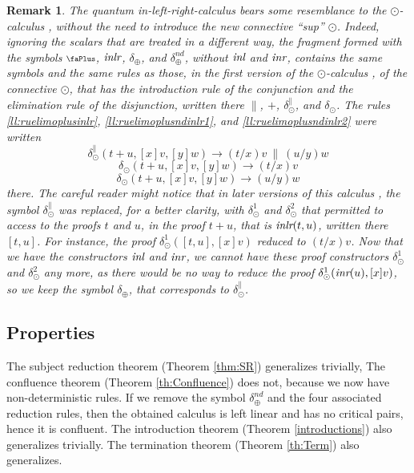 \documentclass[screen, sigconf,authorversion,nonacm]{acmart}
\theoremstyle{acmdefinition}
\newtheorem{remark}[theorem]{Remark}}
\numberwithin{equation}{section}
\newcommand\abstr[1]{[#1]}
\newcommand\inl{\mbox{\it inl}}
\newcommand\inr{\mbox{\it inr}}
\newcommand\inlr{\mbox{\it inlr}}
\newcommand\elimsup{\delta_{\odot}}
\newcommand\plus{\mathrel{\text{\normalfont\scalebox{0.7}{\faPlus}}}}
\newcommand\elimplus{\delta_{\oplus}}
\begin{document}
\begin{remark}
The quantum in-left-right-calculus bears some resemblance to the
$\odot$-calculus \cite{DiazcaroDowekTCS23,DiazcaroDowekMSCS24},
without the need to introduce the new connective ``sup'' $\odot$.
Indeed, ignoring the scalars that are treated in a different way, the
fragment formed with the symbols $\plus$, $\inlr$, $\elimplus$, and
$\elimplus^{nd}$, without $\inl$ and $\inr$, contains the same symbols
and the same rules as those, in the first version of the
$\odot$-calculus \cite{odotICTAC}, of the connective $\odot$, that has
the introduction rule of the conjunction and the elimination rule of
the disjunction, written there $\|$, $+$, $\elimsup^{\parallel}$, and
$\elimsup$. The rules \ref{ll:ruelimoplusinlr},
\ref{ll:ruelimoplusndinlr1}, and \ref{ll:ruelimoplusndinlr2} were
written
$$\elimsup^\|(t + u,\abstr{x}v,\abstr{y}w) \longrightarrow  (t/x)v~\|~(u/y)w$$
$$\elimsup(t+u,\abstr{x}v,\abstr{y}w) \longrightarrow  (t/x)v$$
$$\elimsup(t+u,\abstr{x}v,\abstr{y}w) \longrightarrow  (u/y)w$$
there.  The careful reader might notice that in later versions of
this calculus \cite{DiazcaroDowekTCS23},
the symbol $\elimsup^{\parallel}$
was replaced, for a better clarity,
with $\elimsup^1$ and
$\elimsup^2$ that permitted to access to the proofs $t$ and $u$, in
the proof $t + u$, that is $\inlr(t,u)$, written there $[t,u]$.  For
instance, the proof $\elimsup^1([t,u],\abstr{x} v)$ reduced to
$(t/x)v$.  Now that we have the constructors $\inl$ and $\inr$, we
cannot have these proof constructors $\elimsup^1$ and $\elimsup^2$ any more, as there would be no
way to reduce the proof $\elimsup^1(\inr(u),\abstr{x} v)$, so we keep
the symbol $\elimplus$, that corresponds to $\elimsup^{\parallel}$.
\end{remark}

\subsection{Properties}

The subject reduction theorem (Theorem \ref{thm:SR}) generalizes
trivially, The confluence theorem (Theorem \ref{th:Confluence}) does
not, because we now have non-deterministic rules.  If we remove the
symbol $\elimplus^{nd}$ and the four associated reduction rules, then
the obtained calculus is left linear and has no critical pairs, hence
it is confluent.  The introduction theorem (Theorem
\ref{introductions}) also generalizes trivially.  The termination
theorem (Theorem \ref{th:Term}) also generalizes.
\end{document}
